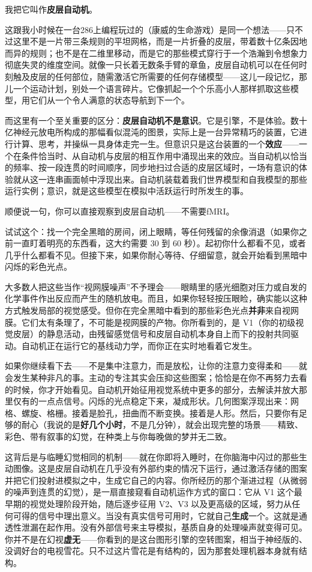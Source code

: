 \documentclass[11pt, twoside, openright]{book}
\begin{document}
我把它叫作\textbf{皮层自动机}。

这跟我小时候在一台286上编程玩过的（康威的生命游戏）是同一个想法------只不过这里不是一片带三条规则的平坦网格，而是一片折叠的皮层，带着数十亿条因地而异的规则；也不是在二维里移动，而是它的那些模式穿行于一个浩瀚到令想象力彻底失灵的维度空间。就像一只长着无数条手臂的章鱼，皮层自动机可以在任何时刻触及皮层的任何部位，随需激活它所需要的任何存储模型------这儿一段记忆，那儿一个运动计划，别处一个语言碎片。它像抓起一个个乐高小人那样抓取这些模型，用它们从一个令人满意的状态导航到下一个。

而这里有一个至关重要的区分：\textbf{皮层自动机不是意识}。它是引擎，不是体验。数十亿神经元放电所构成的那幅看似混沌的图景，实际上是一台异常精巧的装置，它进行计算、思考，并操纵一具身体走完一生。但意识只是这台装置的一个\textbf{效应}------一个在条件恰当时、从自动机与皮层的相互作用中涌现出来的效应。当自动机以恰当的频率、按一段连贯的时间顺序，同步地扫过合适的皮层区域时，一场有意识的体验就从这一连串画面帧中浮现出来。自动机装载着我们世界模型和自我模型的那些运行实例；意识，就是这些模型在模拟中活跃运行时所发生的事。

顺便说一句，你可以直接观察到皮层自动机------不需要fMRI。

试试这个：找一个完全黑暗的房间，闭上眼睛，等任何残留的余像消退（如果你之前一直盯着明亮的东西看，这大约需要 30 到 60 秒）。起初你什么都看不见，或者几乎什么都看不见。但接下来，如果你耐心等待、仔细留意，就会开始看到黑暗中闪烁的彩色光点。

大多数人把这些当作“视网膜噪声”不予理会------眼睛里的感光细胞对压力或自发的化学事件作出反应而产生的随机放电。而且，如果你轻轻按压眼睑，确实能以这种方式触发局部的视觉感受。但你在完全黑暗中看到的那些彩色光点\textbf{并非}来自视网膜。它们太有条理了，不可能是视网膜的产物。你所看到的，是 V1（你的初级视觉皮层）的静息活动，由残留感觉信号和皮层自动机本身自上而下的投射共同驱动。自动机正在运行它的基线动力学，而你正在实时地看着它发生。

如果你继续看下去------不是集中注意力，而是放松，让你的注意力变得柔和------就会发生某种非凡的事。主动的专注其实会压抑这些图案；恰恰是在你不再努力去看的时候，你才开始看见。自动机开始征用视觉系统中更多的部分，去解读并放大那里仅有的一点点信号。闪烁的光点稳定下来，凝成形状。几何图案浮现出来：网格、螺旋、格栅。接着是脸孔，扭曲而不断变换。接着是人形。然后，只要你有足够的耐心（我说的是\textbf{好几个小时}，不是几分钟），就会出现完整的场景------精致、彩色、带有叙事的幻觉，在种类上与你每晚做的梦并无二致。

这背后是与临睡幻觉相同的机制------就在你即将入睡时，在你脑海中闪过的那些生动图像。这是皮层自动机在几乎没有外部约束的情况下运行，通过激活存储的图案并把它们投射进模拟之中，生成它自己的内容。你所经历的那个渐进过程（从微弱的噪声到连贯的幻觉），是一扇直接窥看自动机运作方式的窗口：它从 V1 这个最早期的视觉处理阶段开始，随后逐步征用 V2、V3 以及更高级的区域，努力从任何可得的信号中理出意义。当没有真实信号可用时，它就自己\textbf{生成}一个。这就是通透性泄漏在起作用。没有外部信号来主导模拟，基质自身的处理噪声就变得可见。你并不是在幻视\textbf{虚无}------你看到的是这台图形引擎的空转图案，相当于神经版的、没调好台的电视雪花。只不过这片雪花是有结构的，因为那套处理机器本身就有结构。
\end{document}
